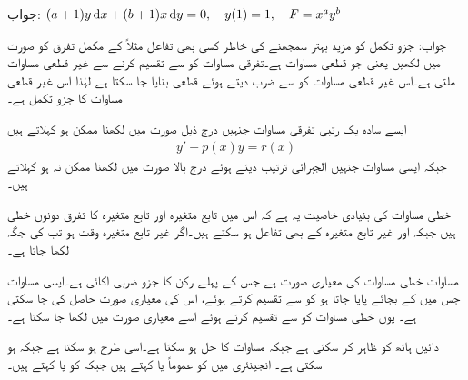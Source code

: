 جواب:
$(a+1)y\dif x+(b+1)x \dif y=0,\quad y(1)=1, \quad F=x^ay^b$

جواب:
جزو تکمل کو مزید بہتر سمجھنے کی خاطر  کسی بھی تفاعل مثلاً  کے مکمل تفرق کو  صورت میں لکھیں یعنی
  جو قطعی مساوات ہے۔تفرقی مساوات کو  سے تقسیم کرنے سے غیر قطعی مساوات 
 ملتی ہے۔اس غیر قطعی مساوات کو  سے ضرب دیتے ہوئے قطعی بنایا جا سکتا ہے لہٰذا  اس غیر قطعی مساوات کا جزو تکمل ہے۔

ایسے سادہ یک رتبی تفرقی مساوات جنہیں درج ذیل صورت میں لکھنا ممکن ہو  کہلاتے ہیں
\begin{align}\label{مساوات_سادہ_اول_خطی}
y'+p(x)y=r(x)
\end{align}
جبکہ ایسی مساوات جنہیں الجبرائی ترتیب دیتے ہوئے درج بالا صورت میں لکھنا ممکن نہ ہو  کہلاتے ہیں۔

خطی مساوات  کی بنیادی خاصیت یہ ہے کہ اس میں تابع متغیرہ  اور تابع متغیرہ کا تفرق  دونوں خطی ہیں جبکہ  اور  غیر تابع متغیرہ  کے  بھی تفاعل ہو سکتے ہیں۔اگر غیر تابع متغیرہ وقت ہو تب  کی جگہ  لکھا جاتا ہے۔

مساوات  خطی مساوات کی معیاری صورت ہے جس کے پہلے رکن  کا جزو ضربی اکائی ہے۔ایسی مساوات جس میں  کے بجائے  پایا جاتا ہو کو  سے تقسیم کرتے ہوئے، اس کی معیاری صورت حاصل کی جا سکتی ہے۔ یوں خطی مساوات 
 کو  سے تقسیم کرتے ہوئے  اسے معیاری صورت  میں لکھا جا سکتا ہے۔

دائیں ہاتھ   کو ظاہر کر سکتی ہے جبکہ مساوات کا حل   ہو سکتا ہے۔اسی طرح   ہو سکتا ہے جبکہ   ہو سکتی ہے۔ انجینئری میں  کو عموماً  یا  کہتے ہیں جبکہ  کو  یا  کہتے ہیں۔  

